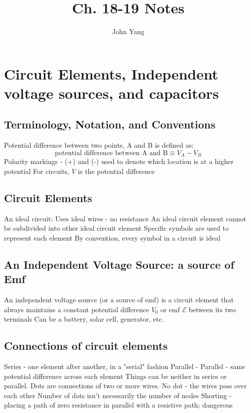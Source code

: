 \documentclass[twocolumn]{article}
\title{Ch. 18-19 Notes}
\author{John Yang}
\begin{document}
\maketitle
\section{Circuit Elements, Independent voltage sources, and capacitors}
\subsection{Terminology, Notation, and Conventions}
\begin{outline}
	\1 Potential difference between two points, A and B is defined as: \[\text{potential difference between A and B}\equiv V_A-V_B\] 
	\1 Polarity markings - (+) and (-) used to denote which location is at a higher potential
	\1 For circuits, $V$ is the potential difference
\end{outline}
\subsection{Circuit Elements}
\begin{outline}
	\1 An ideal circuit: 
		\2 Uses ideal wires - no resistance 
		\2 An ideal circuit element cannot be subdivided into other ideal circuit element
		\2 Specific symbols are used to represent each element 
	\1 By convention, every symbol in a circuit is ideal
\end{outline}
\subsection{An Independent Voltage Source: a source of Emf}
\begin{outline}
	\1 An independent voltage source (or a source of emf) is a circuit element that always maintains a constant potential difference $V_0$ or emf $\mathscr E$ between its two terminals
	\1 Can be a battery, solar cell, generator, etc.
\end{outline}
\subsection{Connections of circuit elements}
\begin{outline}
	\1 Series - one element after another, in a "serial" fashion
	\1 Parallel - Parallel - same potential difference across each element 
	\1 Things can be neither in series or parallel. 
	\1 Dots are connections of two or more wires. No dot - the wires pass over each other
	\1 Number of dots isn't necessarily the number of nodes
	\1 Shorting - placing a path of zero resistance in parallel with a resistive path; dangerous

\end{outline}
\end{document}
